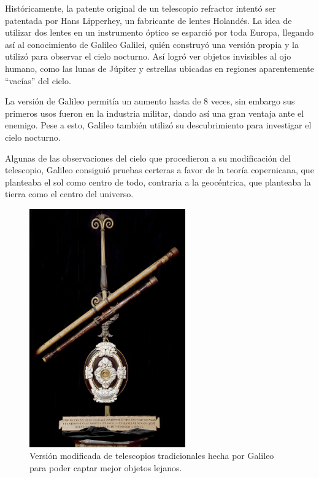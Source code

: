 Históricamente, la patente original de un telescopio refractor intentó ser patentada por Hans Lipperhey, un fabricante de lentes Holandés. La idea de utilizar dos lentes en un instrumento óptico se esparció por toda Europa, llegando así al conocimiento de Galileo Galilei, quién construyó una versión propia y la utilizó para observar el cielo nocturno. Así logró ver objetos invisibles al ojo humano, como las lunas de Júpiter y estrellas ubicadas en regiones aparentemente “vacías” del cielo.

La versión de Galileo permitía un aumento hasta de 8 veces, sin embargo sus primeros usos fueron en la industria militar, dando así una gran ventaja ante el enemigo. Pese a esto, Galileo también utilizó su descubrimiento para investigar el cielo nocturno.

Algunas de las observaciones del cielo que procedieron a su modificación del telescopio, Galileo consiguió pruebas certeras a favor de la teoría copernicana, que planteaba el sol como centro de todo, contraria a la geocéntrica, que planteaba la tierra como el centro del universo. 


\begin{figure}[H]
	\centering
	\includegraphics[width=0.6\textwidth]{images/telescopio_galileo.jpg}
	\caption{Versión modificada de telescopios tradicionales hecha por Galileo para poder captar mejor objetos lejanos.}
	\label{fig:telescopio_patente_galileo}
\end{figure}

